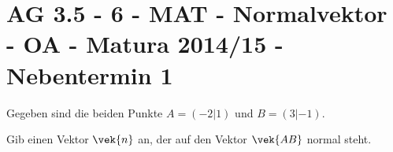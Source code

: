 \section{AG 3.5 - 6 - MAT - Normalvektor - OA - Matura 2014/15 - Nebentermin 1}

\begin{beispiel}[AG 3.5]{1} %
Gegeben sind die beiden Punkte $A=(-2|1)$ und $B=(3|-1)$. \leer

Gib einen Vektor $\vek{n}$ an, der auf den Vektor $\vek{AB}$ normal steht. 

\end{beispiel}